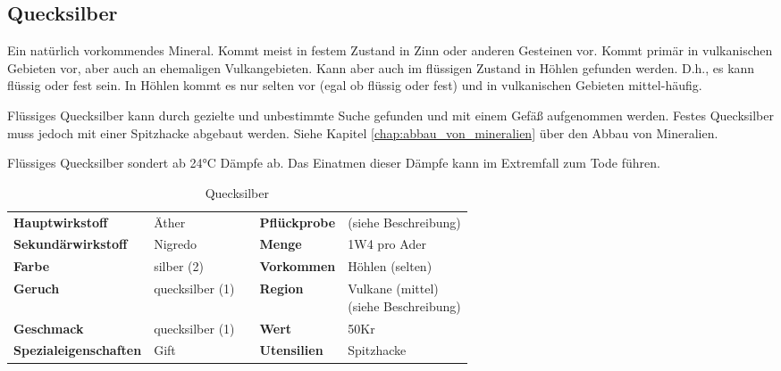 \subsection{Quecksilber}
Ein natürlich vorkommendes Mineral. Kommt meist in festem Zustand in Zinn oder anderen Gesteinen vor. Kommt primär in vulkanischen Gebieten vor, aber auch an ehemaligen Vulkangebieten. Kann aber auch im flüssigen Zustand in Höhlen gefunden werden. D.h., es kann flüssig oder fest sein. In Höhlen kommt es nur selten vor (egal ob flüssig oder fest) und in vulkanischen Gebieten mittel-häufig.

Flüssiges Quecksilber kann durch gezielte und unbestimmte Suche gefunden und mit einem Gefäß aufgenommen werden. Festes Quecksilber muss jedoch mit einer Spitzhacke abgebaut werden. Siehe Kapitel \ref{chap:abbau_von_mineralien} über den Abbau von Mineralien.

Flüssiges Quecksilber sondert ab 24°C Dämpfe ab. Das Einatmen dieser Dämpfe kann im Extremfall zum Tode führen.

\begin{table}[H] 
\begin{center} 
\begin{tabular}{|l|l|p{1cm}|l|l|} 
  	\cline{1-2} \cline{4-5} 
  	\textbf{Hauptwirkstoff} & Äther && \textbf{Pflückprobe} & (siehe Beschreibung) \\ \cline{1-2} \cline{4-5} 
  	\textbf{Sekundärwirkstoff} & Nigredo && \textbf{Menge} & 1W4 pro Ader \\ \cline{1-2} \cline{4-5} 
  	\textbf{Farbe} & silber (2) && \textbf{Vorkommen} & Höhlen (selten) \\ \cline{1-2} \cline{4-5} 
  	\textbf{Geruch} & quecksilber (1) && \textbf{Region} & \brcell{Vulkane (mittel) \\ (siehe Beschreibung)} \\ \cline{1-2} \cline{4-5} 
  	\textbf{Geschmack} & quecksilber (1) && \textbf{Wert} & 50Kr \\ \cline{1-2} \cline{4-5} 
  	\textbf{Spezialeigenschaften} & Gift && \textbf{Utensilien} & Spitzhacke \\ \cline{1-2} \cline{4-5} 
\end{tabular} 
\end{center} 
\caption{Quecksilber} 
\label{tab:quecksilber} 
\end{table}